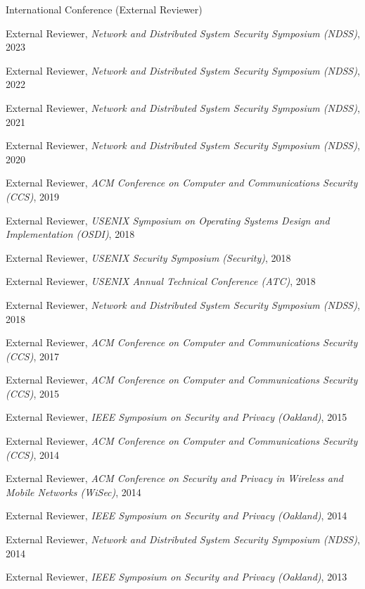 \documentclass[11pt,letterpaper]{article}
\begin{document}
\begin{topic}{International Conference (External Reviewer)}{}
  \item{External Reviewer, \emph{Network and Distributed System Security Symposium (NDSS)}, 2023}
  \item{External Reviewer, \emph{Network and Distributed System Security Symposium (NDSS)}, 2022}
  \item{External Reviewer, \emph{Network and Distributed System Security Symposium (NDSS)}, 2021}
  \item{External Reviewer, \emph{Network and Distributed System Security Symposium (NDSS)}, 2020}
  \item{External Reviewer, \emph{ACM Conference on Computer and Communications Security (CCS)}, 2019}
  \item{External Reviewer, \emph{USENIX Symposium on Operating Systems Design and Implementation (OSDI)}, 2018}
  \item{External Reviewer, \emph{USENIX Security Symposium (Security)}, 2018}
  \item{External Reviewer, \emph{USENIX Annual Technical Conference (ATC)}, 2018}
  \item{External Reviewer, \emph{Network and Distributed System Security Symposium (NDSS)}, 2018}
  \item{External Reviewer, \emph{ACM Conference on Computer and Communications Security (CCS)}, 2017}
  \item{External Reviewer, \emph{ACM Conference on Computer and Communications Security (CCS)}, 2015}
  \item{External Reviewer, \emph{IEEE Symposium on Security and Privacy (Oakland)}, 2015}
  \item{External Reviewer, \emph{ACM Conference on Computer and Communications Security (CCS)}, 2014}
  \item{External Reviewer, \emph{ACM Conference on Security and Privacy in Wireless and Mobile Networks (WiSec)}, 2014}
  \item{External Reviewer, \emph{IEEE Symposium on Security and Privacy (Oakland)}, 2014}
  \item{External Reviewer, \emph{Network and Distributed System Security Symposium (NDSS)}, 2014}
  \item{External Reviewer, \emph{IEEE Symposium on Security and Privacy (Oakland)}, 2013}
\end{topic}
\end{document}
